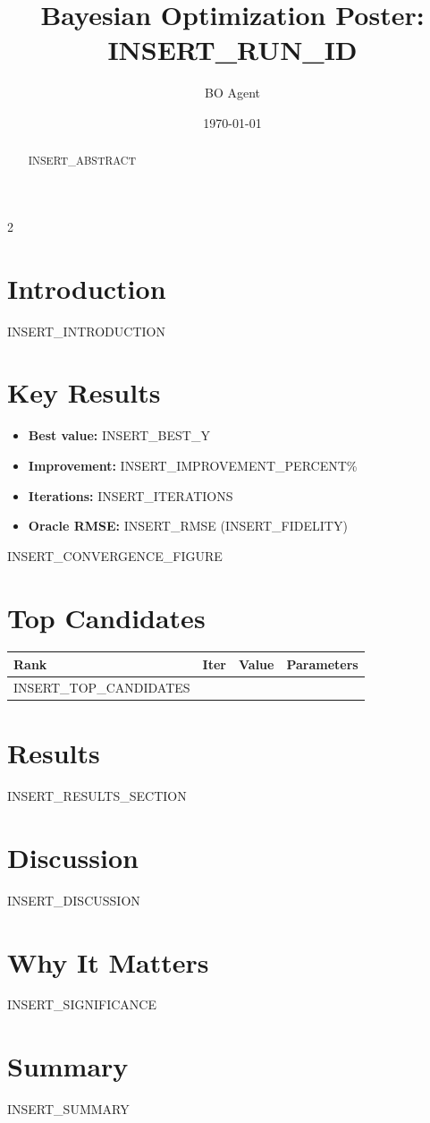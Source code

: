 \documentclass[10pt,letterpaper]{article}
\title{Bayesian Optimization Poster: INSERT_RUN_ID}
\author{BO Agent}
\date{\today}
\begin{document}
\maketitle

\begin{abstract}
INSERT_ABSTRACT
\end{abstract}

\begin{multicols}{2}

\section*{Introduction}
INSERT_INTRODUCTION

\section*{Key Results}
\begin{itemize}
  \item \textbf{Best value:} INSERT_BEST_Y
  \item \textbf{Improvement:} INSERT_IMPROVEMENT_PERCENT\%
  \item \textbf{Iterations:} INSERT_ITERATIONS
  \item \textbf{Oracle RMSE:} INSERT_RMSE (INSERT_FIDELITY)
\end{itemize}

INSERT_CONVERGENCE_FIGURE

\section*{Top Candidates}
\small
\begin{tabular}{@{}lrlp{4.3cm}@{}}
\toprule
\textbf{Rank} & \textbf{Iter} & \textbf{Value} & \textbf{Parameters} \\
\midrule
INSERT_TOP_CANDIDATES
\bottomrule
\end{tabular}
\normalsize

\section*{Results}
INSERT_RESULTS_SECTION

\section*{Discussion}
INSERT_DISCUSSION

\section*{Why It Matters}
INSERT_SIGNIFICANCE

\section*{Summary}
INSERT_SUMMARY

\end{multicols}
\end{document}
